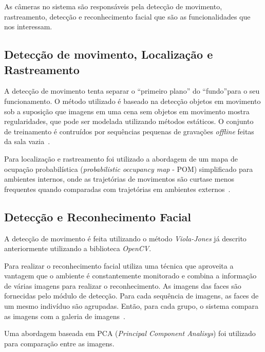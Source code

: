 As câmeras no sistema são responsáveis pela detecção de movimento, rastreamento, detecção e reconhecimento facial que são as funcionalidades que nos interessam.

\subsection{Detecção de movimento, Localização e Rastreamento}

A detecção de movimento tenta separar o ``primeiro plano'' do ``fundo''para o seu funcionamento. O método utilizado é baseado na detecção objetos em movimento sob a suposição que imagens em uma cena sem objetos em movimento mostra regularidades, que pode ser modelada utilizando métodos estáticos. O conjunto de treinamento é contruídos por sequências pequenas de gravações \textit{offline} feitas da sala vazia~\cite{salah}.

Para localização e rastreamento foi utilizado a abordagem de um mapa de ocupação probabilística (\textit{probabilistic occupancy map} - POM) simplificado para ambientes internos, onde as trajetórias de movimentos são curtase menos frequentes quando comparadas com trajetórias em ambientes externos~\cite{salah}.

\subsection{Detecção e Reconhecimento Facial}

A detecção de movimento é feita utilizando o método \textit{Viola-Jones} já descrito anteriormente utilizando a biblioteca \textit{OpenCV}. 

Para realizar o reconhecimento facial utiliza uma técnica que aproveita a vantagem que o ambiente é constantemente monitorado e combina a informação de várias imagens para realizar o reconhecimento. As imagens das faces são fornecidas pelo módulo de detecção.
Para cada sequência de imagens, as faces de um mesmo indivíduo são agrupadas. Então, para cada grupo, o sistema compara as imagens com a galeria de imagens~\cite{salah}. 

Uma abordagem baseada em PCA (\textit{Principal Component Analisys}) foi utilizado para comparação entre as imagens.


